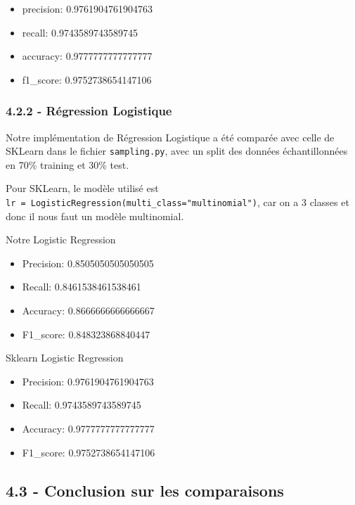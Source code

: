\documentclass[
]{article}
\begin{document}
\begin{itemize}
\item
  precision: 0.9761904761904763
\item
  recall: 0.9743589743589745
\item
  accuracy: 0.9777777777777777
\item
  f1\_score: 0.9752738654147106
\end{itemize}

\hypertarget{ruxe9gression-logistique-2}{%
\subsubsection{4.2.2 - Régression
Logistique}\label{ruxe9gression-logistique-2}}

Notre implémentation de Régression Logistique a été comparée avec celle
de SKLearn dans le fichier \texttt{sampling.py}, avec un split des
données échantillonnées en 70\% training et 30\% test.

Pour SKLearn, le modèle utilisé est
\texttt{lr\ =\ LogisticRegression(multi\_class="multinomial")}, car on a
3 classes et donc il nous faut un modèle multinomial.
\cite{sklearnLogReg}

Notre Logistic Regression

\begin{itemize}
\item
  Precision: 0.8505050505050505
\item
  Recall: 0.8461538461538461
\item
  Accuracy: 0.8666666666666667
\item
  F1\_score: 0.848323868840447
\end{itemize}

Sklearn Logistic Regression

\begin{itemize}
\item
  Precision: 0.9761904761904763
\item
  Recall: 0.9743589743589745
\item
  Accuracy: 0.9777777777777777
\item
  F1\_score: 0.9752738654147106
\end{itemize}

\hypertarget{conclusion-sur-les-comparaisons}{%
\subsection{4.3 - Conclusion sur les
comparaisons}\label{conclusion-sur-les-comparaisons}}
\end{document}
